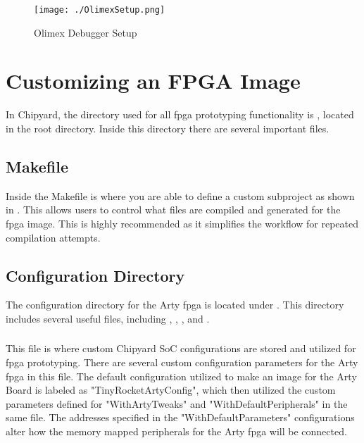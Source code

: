 \begin{figure}[h!tbp]
  \centering
  \texttt{[image: ./OlimexSetup.png]}
  \caption{Olimex Debugger Setup~\cite[p.~5]{FreedomDevGuide}}
  \label{fig:olimexsetup}
\end{figure}

\section{Customizing an FPGA Image}\label{sec:Customizing}
In Chipyard, the directory used for all \Gls{fpga} prototyping functionality is , located in the root directory.
Inside this directory there are several important files.

\subsection{Makefile}\label{sec:Customizing_FPGA-Makefile}
Inside the Makefile is where you are able to define a custom subproject as shown in .
This allows users to control what files are compiled and generated for the \Gls{fpga} image.
This is highly recommended as it simplifies the workflow for repeated compilation attempts.

\subsection{Configuration Directory}\label{sec:Customizing_FPGA-Config_Directory}
The configuration directory for the Arty \Gls{fpga} is located under .
This directory includes several useful files, including , , , and .

\subsubsection{}\label{sec:Customizing_FPGA-Configs.scala}
This file is where custom Chipyard SoC configurations are stored and utilized for \Gls{fpga} prototyping. There are several custom configuration parameters for the Arty \Gls{fpga} in this file. The default configuration utilized to make an image for the Arty Board is labeled as "TinyRocketArtyConfig", which then utilized the custom parameters defined for "WithArtyTweaks" and "WithDefaultPeripherals" in the same file. The addresses specified in the "WithDefaultParameters" configurations alter how the memory mapped peripherals for the Arty \Gls{fpga} will be connected.

